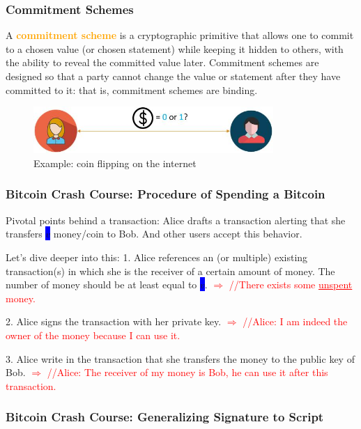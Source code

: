 \documentclass{beamer}
\begin{document}
\begin{frame}\frametitle{Commitment Schemes} 
A \textcolor{orange}{\textbf{commitment scheme}} is a cryptographic primitive that allows one to commit to a chosen value (or chosen statement) while keeping it hidden to others, with the ability to reveal the committed value later. Commitment schemes are designed so that a party cannot change the value or statement after they have committed to it: that is, commitment schemes are binding.
\begin{figure}
	\includegraphics[width=3.6 in, height=0.7in]{myfigs/coin-flipping.jpg}
	\caption{Example: coin flipping on the internet}
\end{figure}
\end{frame}

\begin{frame}\frametitle{Bitcoin Crash Course: Procedure of Spending a Bitcoin} 
\begin{alertblock}{Pivotal points behind a transaction:}
Alice drafts a transaction alerting that she transfers \colorbox{blue}{$v$} money/coin to Bob. And other users accept this behavior.
\end{alertblock}
\begin{block}{Let's dive deeper into this:}
1. Alice references an (or multiple) existing transaction(s) in which she is the receiver of a certain amount of money. The number of money should be at least equal to \colorbox{blue}{$v$}. \newline\textcolor{red}{$\Longrightarrow$ //There exists some \underline{unspent} money.}

2. Alice signs the transaction with her private key. \newline\textcolor{red}{$\Longrightarrow$ //Alice: I am indeed the owner of the money because I can use it.}

3. Alice write in the transaction that she transfers the money to the public key of Bob. \newline\textcolor{red}{$\Longrightarrow$ //Alice: The receiver of my money is Bob, he can use it after this transaction.}
\end{block}

\end{frame}

\begin{frame}\frametitle{Bitcoin Crash Course: Generalizing Signature to Script} 

\end{frame}
\end{document}
